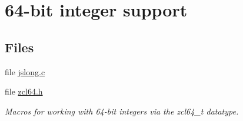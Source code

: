 \hypertarget{group__zcl__64}{\section{64-\/bit integer support}
\label{group__zcl__64}
}
\subsection*{Files}
\begin{DoxyCompactItemize}
\item 
file \hyperlink{jslong_8c}{jslong.\-c}
\item 
file \hyperlink{zcl64_8h}{zcl64.\-h}
\begin{DoxyCompactList}\small\item\em Macros for working with 64-\/bit integers via the zcl64\-\_\-t datatype. \end{DoxyCompactList}\end{DoxyCompactItemize}
